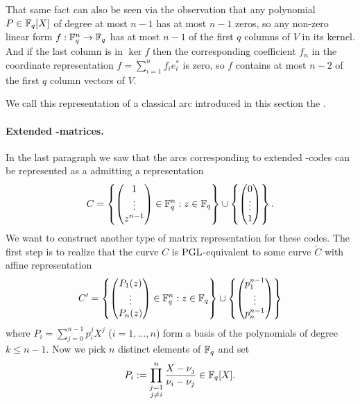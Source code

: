 That same fact can also be seen via the observation that any polynomial $P\in\mathbb{F}_{q}[X]$ of degree at most $n-1$ has at most $n-1$ zeros, so any non-zero linear form $f:\mathbb{F}_{q}^n\rightarrow\mathbb{F}_{q}$ has at most $n-1$ of the first $q$ columns of $V$ in its kernel.
And if the last column is in $\ker{f}$ then the corresponding coefficient $f_n$ in the coordinate representation $f=\sum_{i=1}^n{f_i e_i^{\ast}}$ is zero, so $f$ contains at most $n-2$ of the first $q$ column vectors of $V$.

We call this representation of a classical arc introduced in this section the .

\paragraph{Extended -matrices.}%

In the last paragraph we saw that the arcs corresponding to extended -codes can be represented as a  admitting a representation
$$ C = \left\{\begin{pmatrix} 1 \\
            \vdots            \\
            z^{n-1}\end{pmatrix}\in\mathbb{F}_{q}^n:z\in \mathbb{F}_{q}\right\}\cup
    \left\{\begin{pmatrix} 0    \\
            \vdots            \\
            1\end{pmatrix}\right\}\textrm{.} $$
We want to construct another type of matrix representation for these codes.
The first step is to realize that the curve $C$ is $\mathrm{PGL}$-equivalent to some curve $\tilde{C}$ with affine representation
$$ C' = \left\{
    \begin{pmatrix} P_1(z)             \\
        \vdots                         \\
        P_n(z)\end{pmatrix}\in\mathbb{F}_{q}^n:z\in \mathbb{F}_{q}\right\}
\cup\left\{\begin{pmatrix} p_1^{n-1} \\
        \vdots                         \\
        p_n^{n-1}\end{pmatrix}\right\} $$
where $P_i=\sum_{j=0}^{n-1}{p_i^j X^j}$ ($i=1,\ldots,n$) form a basis of the polynomials of degree $k\leq n-1$. Now we pick $n$ distinct elements of $\mathbb{F}_{q}$ and set
$$ P_i := \prod_{\substack{j=1\\ j\neq i}}^n{\frac{X-\nu_j}{\nu_i-\nu_j}}\in\mathbb{F}_{q}[X]\textrm{.} $$


